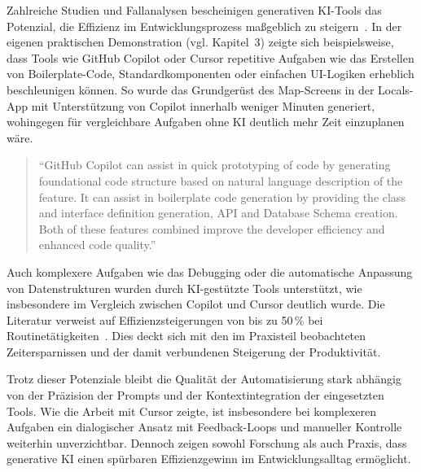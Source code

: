 Zahlreiche Studien und Fallanalysen bescheinigen generativen KI-Tools das
Potenzial, die Effizienz im Entwicklungsprozess maßgeblich zu
steigern~\cite{donvir_role_2024,coutinho_role_2024,s_future_2024,esposito_generative_2025,braun_ki_2024,siebert_generative_2024}.
In der eigenen praktischen Demonstration (vgl. Kapitel~3) zeigte sich
beispielsweise, dass Tools wie GitHub Copilot oder Cursor repetitive Aufgaben
wie das Erstellen von Boilerplate-Code, Standardkomponenten oder einfachen
UI-Logiken erheblich beschleunigen können. So wurde das Grundgerüst des
Map-Screens in der Locals-App mit Unterstützung von Copilot innerhalb weniger
Minuten generiert, wohingegen für vergleichbare Aufgaben ohne KI deutlich mehr
Zeit einzuplanen wäre.

\begin{quote}
    \enquote{GitHub Copilot can assist in quick prototyping of code by generating foundational code structure based on natural language description of the feature. It can assist in boilerplate code generation by providing the class and interface definition generation, API and Database Schema creation. Both of these features combined improve the developer efficiency and enhanced code quality.}
    \cite[S.~8]{donvir_role_2024}
\end{quote}

Auch komplexere Aufgaben wie das Debugging oder die automatische Anpassung von
Datenstrukturen wurden durch KI-gestützte Tools unterstützt, wie insbesondere
im Vergleich zwischen Copilot und Cursor deutlich wurde. Die Literatur verweist
auf Effizienzsteigerungen von bis zu 50\,\% bei
Routinetätigkeiten~\cite{s_future_2024}. Dies deckt sich mit den im Praxisteil
beobachteten Zeitersparnissen und der damit verbundenen Steigerung der
Produktivität.

Trotz dieser Potenziale bleibt die Qualität der Automatisierung stark abhängig
von der Präzision der Prompts und der Kontextintegration der eingesetzten
Tools. Wie die Arbeit mit Cursor zeigte, ist insbesondere bei komplexeren
Aufgaben ein dialogischer Ansatz mit Feedback-Loops und manueller Kontrolle
weiterhin unverzichtbar. Dennoch zeigen sowohl Forschung als auch Praxis, dass
generative KI einen spürbaren Effizienzgewinn im Entwicklungsalltag ermöglicht.


